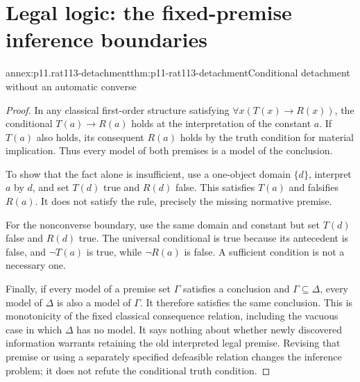 \section{Legal logic: the fixed-premise inference boundaries}
\label{annex:p11-rat113-fixed-premises}

\begin{annexitem}{annex:p11.rat113-detachment}{thm:p11-rat113-detachment}{Conditional detachment without an automatic converse}
\begin{proof}
In any classical first-order structure satisfying
\(\forall x(T(x)\to R(x))\), the conditional
\(T(a)\to R(a)\) holds at the interpretation of the constant \(a\).
If \(T(a)\) also holds, its consequent \(R(a)\) holds by the truth
condition for material implication. Thus every model of both premises is
a model of the conclusion.

To show that the fact alone is insufficient, use a one-object domain
\(\{d\}\), interpret \(a\) by \(d\), and set \(T(d)\) true and
\(R(d)\) false. This satisfies \(T(a)\) and falsifies \(R(a)\).
It does not satisfy the rule, precisely the missing normative premise.

For the nonconverse boundary, use the same domain and constant but set
\(T(d)\) false and \(R(d)\) true. The universal conditional is true
because its antecedent is false, and \(\neg T(a)\) is true, while
\(\neg R(a)\) is false. A sufficient condition is not a necessary one.

Finally, if every model of a premise set \(\Gamma\) satisfies a
conclusion and \(\Gamma\subseteq\Delta\), every model of
\(\Delta\) is also a model of \(\Gamma\). It therefore satisfies
the same conclusion. This is monotonicity of the fixed classical consequence
relation, including the vacuous case in which \(\Delta\) has no model.
It says nothing about whether newly discovered information warrants
retaining the old interpreted legal premise. Revising that premise or
using a separately specified defeasible relation changes the inference
problem; it does not refute the conditional truth condition.
\end{proof}
\end{annexitem}

